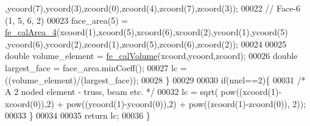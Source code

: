 \begin{DoxyCode}
      ,ycoord(7),ycoord(3),zcoord(0),zcoord(4),zcoord(7),zcoord(3));
00022         \textcolor{comment}{// Face-6 (1, 5, 6, 2)}
00023         face\_area(5) = \hyperlink{functions_8h_ac1306a43db522f3da30471d2a6c48686}{fe\_calArea\_4}(xcoord(1),xcoord(5),xcoord(6),xcoord(2),ycoord(1),ycoord(5)
      ,ycoord(6),ycoord(2),zcoord(1),zcoord(5),zcoord(6),zcoord(2));
00024 
00025         \textcolor{keywordtype}{double} volume\_element = \hyperlink{functions_8h_a00f586c9a4bc56ec486776402fc26605}{fe\_calVolume}(xcoord,ycoord,zcoord);
00026         \textcolor{keywordtype}{double} largest\_face = face\_area.minCoeff();
00027         lc = ((volume\_element)/(largest\_face));
00028     \}
00029 
00030     \textcolor{keywordflow}{if}(nnel==2)\{
00031         \textcolor{comment}{/* A 2 noded element - truss, beam etc. */}
00032         lc = sqrt( pow((xcoord(1)-xcoord(0)),2) + pow((ycoord(1)-ycoord(0)),2) + pow((zcoord(1)-zcoord(0)),
      2));
00033     \}
00034 
00035         \textcolor{keywordflow}{return} lc;
00036 \}
\end{DoxyCode}

